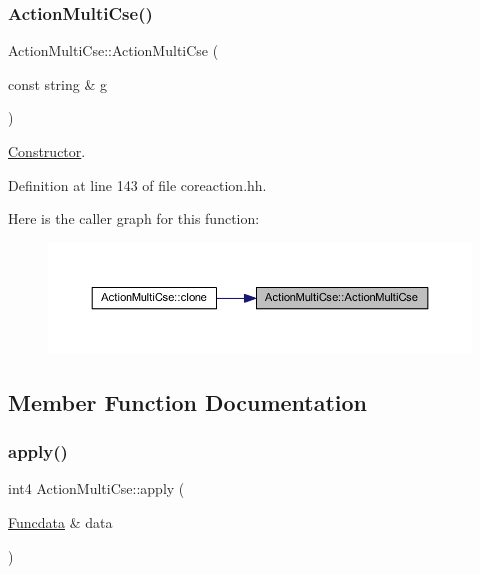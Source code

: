 \subsubsection{\texorpdfstring{ActionMultiCse()}{ActionMultiCse()}}
{\footnotesize\ttfamily Action\+Multi\+Cse\+::\+Action\+Multi\+Cse (\begin{DoxyParamCaption}\item[{const string \&}]{g }\end{DoxyParamCaption})\hspace{0.3cm}{\ttfamily [inline]}}



\mbox{\hyperlink{class_constructor}{Constructor}}. 



Definition at line 143 of file coreaction.\+hh.

Here is the caller graph for this function\+:
\nopagebreak
\begin{figure}[H]
\begin{center}
\leavevmode
\includegraphics[width=350pt]{class_action_multi_cse_ad0077bb22d42f013f480c32a7da7acfa_icgraph}
\end{center}
\end{figure}


\subsection{Member Function Documentation}
\mbox{\label{class_action_multi_cse_a7a79627973a87279ddcadc497c516c2e}} 
\subsubsection{\texorpdfstring{apply()}{apply()}}
{\footnotesize\ttfamily int4 Action\+Multi\+Cse\+::apply (\begin{DoxyParamCaption}\item[{\mbox{\hyperlink{class_funcdata}{Funcdata}} \&}]{data }\end{DoxyParamCaption})\hspace{0.3cm}{\ttfamily [virtual]}}



